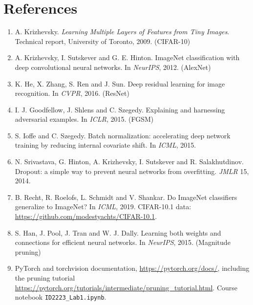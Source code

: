 \documentclass[11pt,a4paper]{article}
\begin{document}
\section*{References}
\begin{enumerate}[leftmargin=*]
\item A. Krizhevsky. \emph{Learning Multiple Layers of Features from Tiny Images}. Technical report, University of Toronto, 2009. (CIFAR-10)
\item A. Krizhevsky, I. Sutskever and G. E. Hinton. ImageNet classification with deep convolutional neural networks. In \emph{NeurIPS}, 2012. (AlexNet)
\item K. He, X. Zhang, S. Ren and J. Sun. Deep residual learning for image recognition. In \emph{CVPR}, 2016. (ResNet)
\item I. J. Goodfellow, J. Shlens and C. Szegedy. Explaining and harnessing adversarial examples. In \emph{ICLR}, 2015. (FGSM)
\item S. Ioffe and C. Szegedy. Batch normalization: accelerating deep network training by reducing internal covariate shift. In \emph{ICML}, 2015.
\item N. Srivastava, G. Hinton, A. Krizhevsky, I. Sutskever and R. Salakhutdinov. Dropout: a simple way to prevent neural networks from overfitting. \emph{JMLR} 15, 2014.
\item B. Recht, R. Roelofs, L. Schmidt and V. Shankar. Do ImageNet classifiers generalize to ImageNet? In \emph{ICML}, 2019. CIFAR-10.1 data: \url{https://github.com/modestyachts/CIFAR-10.1}.
\item S. Han, J. Pool, J. Tran and W. J. Dally. Learning both weights and connections for efficient neural networks. In \emph{NeurIPS}, 2015. (Magnitude pruning)
\item PyTorch and torchvision documentation, \url{https://pytorch.org/docs/}, including the pruning tutorial \url{https://pytorch.org/tutorials/intermediate/pruning_tutorial.html}. Course notebook \texttt{ID2223\_Lab1.ipynb}.
\end{enumerate}
\end{document}
